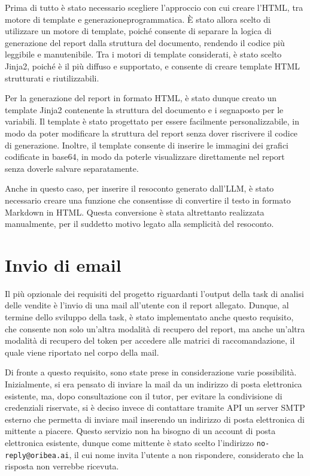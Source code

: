 Prima di tutto è stato necessario scegliere l'approccio con cui creare l'HTML, tra motore di template e \gls{generazioneprogrammatica}. È stato allora scelto di utilizzare un motore di template, poiché consente di separare la logica di generazione del report dalla struttura del documento, rendendo il codice più leggibile e manutenibile. Tra i motori di template considerati, è stato scelto Jinja2, poiché è il più diffuso e supportato, e consente di creare template HTML strutturati e riutilizzabili.

Per la generazione del report in formato HTML, è stato dunque creato un template Jinja2 contenente la struttura del documento e i segnaposto per le variabili. Il template è stato progettato per essere facilmente personalizzabile, in modo da poter modificare la struttura del report senza dover riscrivere il codice di generazione. Inoltre, il template consente di inserire le immagini dei grafici codificate in base64, in modo da poterle visualizzare direttamente nel report senza doverle salvare separatamente.

Anche in questo caso, per inserire il resoconto generato dall'LLM, è stato necessario creare una funzione che consentisse di convertire il testo in formato Markdown in HTML. Questa conversione è stata altrettanto realizzata manualmente, per il suddetto motivo legato alla semplicità del resoconto.


\section{Invio di email}

Il più opzionale dei requisiti del progetto riguardanti l'output della task di analisi delle vendite è l'invio di una mail all'utente con il report allegato. Dunque, al termine dello sviluppo della task, è stato implementato anche questo requisito, che consente non solo un'altra modalità di recupero del report, ma anche un'altra modalità di recupero del token per accedere alle matrici di raccomandazione, il quale viene riportato nel corpo della mail.

Di fronte a questo requisito, sono state prese in considerazione varie possibilità.
Inizialmente, si era pensato di inviare la mail da un indirizzo di posta elettronica esistente, ma, dopo consultazione con il tutor, per evitare la condivisione di credenziali riservate, si è deciso invece di contattare tramite API un server SMTP esterno che permetta di inviare mail inserendo un indirizzo di posta elettronica di mittente a piacere. Questo servizio non ha bisogno di un account di posta elettronica esistente, dunque come mittente è stato scelto l'indirizzo \texttt{no-reply@oribea.ai}, il cui nome invita l'utente a non rispondere, considerato che la risposta non verrebbe ricevuta.

